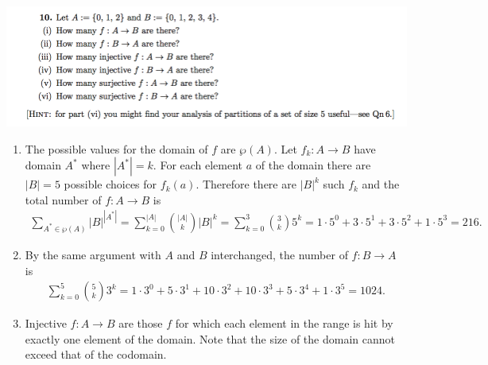 \documentclass[12pt]{article}
\begin{document}
\newpage
\subsection*{} %
\includegraphics[width=500pt]{img/iulm-1-10.png}
\begin{mdframed}
\begin{enumerate}[label=(\roman*)]

\item The possible values for the domain of $f$ are $\wp(A)$. Let $f_k:A \to B$
  have domain $A^*$ where $|A^*| = k$. For each element $a$ of the domain there
  are $|B| = 5$ possible choices for $f_k(a)$. Therefore there are $|B|^k$ such
  $f_k$ and the total number of $f:A \to B$ is
  \begin{align*}
   \sum_{A^* \in \wp(A)} |B|^{|A^*|}
    = \sum_{k=0}^{|A|} {|A| \choose k} |B|^k
    = \sum_{k=0}^3 {3 \choose k} 5^k
    = 1 \cdot 5^0 %
    + 3 \cdot 5^1 %
    + 3 \cdot 5^2 %
    + 1 \cdot 5^3 %
    =                         216.
  \end{align*}
\item By the same argument with $A$ and $B$ interchanged, the number of
  $f: B \to A$ is
  \begin{align*}
    \sum_{k=0}^5 {5 \choose k} 3^k
    = 1 \cdot 3^0  %
    + 5 \cdot 3^1  %
    + 10 \cdot 3^2 %
    + 10 \cdot 3^3 %
    + 5 \cdot 3^4  %
    + 1 \cdot 3^5  %
    =                         1024.
  \end{align*}

\item Injective $f:A \to B$ are those $f$ for which each element in the range
  is hit by exactly one element of the domain. Note that the size of the domain
  cannot exceed that of the codomain.


\end{enumerate}
\end{mdframed}
\end{document}
